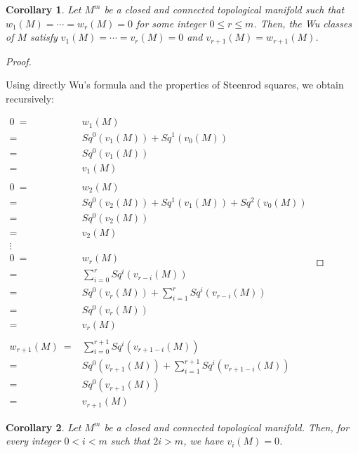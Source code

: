 \documentclass[12pt,oneside]{book}
\newtheorem{cor}    {Corollary}[chapter]
\newcommand{\ds}{\displaystyle}
\begin{document}
    \begin{cor}\label{ap_wu_2}
	Let $M^{m}$ be a closed and connected topological manifold such that $w_{1}(M)=\cdots=w_{r}(M)=0$ for some 
    integer $0\leq r\leq m$. Then, the Wu classes of $M$ satisfy $v_{1}(M)=\cdots=v_{r}(M)=0$ and $v_{r+1}(M)=w_{r+1}(M)$.
    \end{cor}

    \begin{proof}

        \

    	Using directly Wu's formula and the properties of Steenrod squares, we obtain recursively:
    
    	$ \begin{array}{rl}
    		0 \ = & w_{1}(M) \\
    		= & Sq^{0}(v_{1}(M))+Sq^{1}(v_{0}(M)) \\
    		= & Sq^{0}(v_{1}(M)) \\
    		= & v_{1}(M) \\
    		& \\
    		0 \ = & w_{2}(M) \\
    		= & Sq^{0}(v_{2}(M))+Sq^{1}(v_{1}(M))+Sq^{2}(v_{0}(M)) \\
    		= & Sq^{0}(v_{2}(M)) \\
    		= & v_{2}(M) \\
    		\vdots & \\
    		0 \ = & w_{r}(M) \\
    		= & \ds\sum_{i=0}^{r}Sq^{i}(v_{r-i}(M)) \\
    		= & Sq^{0}(v_{r}(M))+\ds\sum_{i=1}^{r}Sq^{i}(v_{r-i}(M)) \\
    		= & Sq^{0}(v_{r}(M)) \\
    		= & v_{r}(M) \\
    		& \\
    		w_{r+1}(M) \ = & \ds\sum_{i=0}^{r+1}Sq^{i}(v_{r+1-i}(M)) \\
    		= & Sq^{0}(v_{r+1}(M))+\ds\sum_{i=1}^{r+1}Sq^{i}(v_{r+1-i}(M)) \\
    		= & Sq^{0}(v_{r+1}(M)) \\
    		= & v_{r+1}(M)
    	\end{array} $

    \end{proof}

    \begin{cor}\label{ap_wu_3}
    	Let $M^{m}$ be a closed and connected topological manifold. Then, for every integer $0< i< m$ such that 
        $2i>m$, we have $v_{i}(M)=0$.
    \end{cor}
\end{document}
